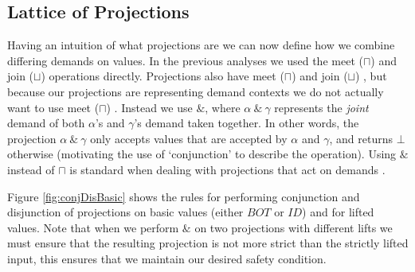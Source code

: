 \documentclass[preprint]{sigplanconf}
\def \meet {\<meet\> ($\sqcap$) }
\def \join {\<join\> ($\sqcup$) }
\DeclareMathOperator{\pmeet}{\&}
\begin{document}
\subsection{Lattice of Projections}

Having an intuition  of what projections are we can now define how we combine
differing demands on values. In the previous analyses we used the \meet and
\join operations directly. Projections also have \meet and \join, but because
our projections are representing demand contexts we do not actually want to use
\meet. Instead we use $\pmeet$, where $\alpha\ \pmeet\ \gamma$ represents the
\emph{joint} demand of both $\alpha$'s and $\gamma$'s demand taken together. In
other words, the projection $\alpha\ \pmeet\ \gamma$ only accepts values that
are accepted by $\alpha$ and $\gamma$, and returns $\bot$ otherwise (motivating
the use of `conjunction' to describe the operation). Using $\pmeet$ instead of
$\sqcap$ is standard when dealing with projections that act on demands
\citep{wadler1987projections, hinze1995projection, SergeyDemand}.

Figure \ref{fig:conjDisBasic} shows the rules for performing conjunction and
disjunction of projections on basic values (either $BOT$ or $ID$) and for
lifted values. Note that when we perform $\pmeet$ on two projections with
different lifts we must ensure that the resulting projection is not more strict
than the strictly lifted input, this ensures that we maintain our desired safety
condition.
\end{document}
